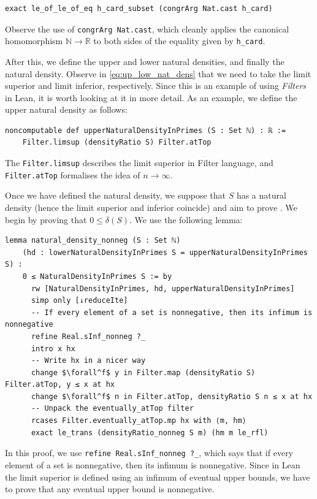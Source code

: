 \documentclass[a4paper,11pt]{article}
\theoremstyle{plain}
\newcommand{\N}{\ensuremath{\mathbb{N}}} %
\newcommand{\R}{\ensuremath{\mathbb{R}}} %
\begin{document}
    \begin{lstlisting}[caption={Application of a theorem to both sides of an equality.}, label={list:2}]
		exact le_of_le_of_eq h_card_subset (congrArg Nat.cast h_card)
	\end{lstlisting}
    Observe the use of \lstinline|congrArg Nat.cast|, which cleanly applies the canonical homomorphism $\N\rightarrow\R$ to both sides of the equality given by \lstinline|h_card|.

    After this, we define the upper and lower natural densities, and finally the natural density. Observe in \eqref{eq:up_low_nat_dens} that we need to take the limit superior and limit inferior, respectively. Since this is an example of using \emph{Filters} in Lean, it is worth looking at it in more detail. As an example, we define the upper natural density as follows:\\
    \begin{lstlisting}[caption={Definition of the upper natural density.}, label={list:3}]
	noncomputable def upperNaturalDensityInPrimes (S : Set ℕ) : ℝ :=
    Filter.limsup (densityRatio S) Filter.atTop
	\end{lstlisting}
    The \lstinline|Filter.limsup| describes the limit superior in Filter language, and \lstinline|Filter.atTop| formalises the idea of $n\rightarrow\infty$. 

    Once we have defined the natural density, we suppose that $S$ has a natural density (hence the limit superior and inferior coincide) and aim to prove . We begin by proving that $0\leq\delta(S)$. We use the following lemma:\\
    \begin{lstlisting}[caption={Proof that $0\leq\delta(S)$.}, label={list:4}]
	lemma natural_density_nonneg (S : Set ℕ)
    (hd : lowerNaturalDensityInPrimes S = upperNaturalDensityInPrimes S) :
    0 ≤ NaturalDensityInPrimes S := by
      rw [NaturalDensityInPrimes, hd, upperNaturalDensityInPrimes]
      simp only [↓reduceIte]
      -- If every element of a set is nonnegative, then its infimum is nonnegative
      refine Real.sInf_nonneg ?_
      intro x hx
      -- Write hx in a nicer way
      change $\forall^f$ y in Filter.map (densityRatio S) Filter.atTop, y ≤ x at hx
      change $\forall^f$ n in Filter.atTop, densityRatio S n ≤ x at hx
      -- Unpack the eventually_atTop filter
      rcases Filter.eventually_atTop.mp hx with ⟨m, hm⟩
      exact le_trans (densityRatio_nonneg S m) (hm m le_rfl)
	\end{lstlisting}
    In this proof, we use \lstinline|refine Real.sInf_nonneg ?_|, which says that if every element of a set is nonnegative, then its infimum is nonnegative. Since in Lean the limit superior is defined using an infimum of eventual upper bounds, we have to prove that any eventual upper bound is nonnegative.
\end{document}
